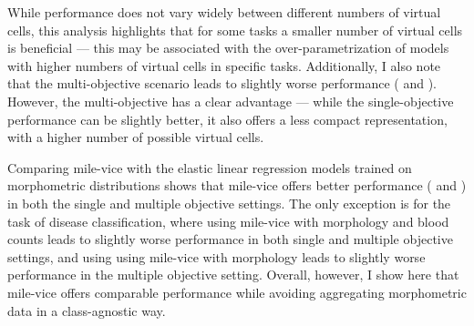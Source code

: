 While performance does not vary widely between different numbers of virtual cells, this analysis highlights that for some tasks a smaller number of virtual cells is beneficial --- this may be associated with the over-parametrization of models with higher numbers of virtual cells in specific tasks. Additionally, I also note that the multi-objective scenario leads to slightly worse performance ( and ). However, the multi-objective has a clear advantage --- while the single-objective performance can be slightly better, it also offers a less compact representation, with a higher number of possible virtual cells.

\begin{figure}[!ht]
    \label{fig:mile-vice-roc-curves}
\end{figure}

Comparing \ac{mile-vice} with the elastic linear regression models trained on morphometric distributions shows that \ac{mile-vice} offers better performance ( and ) in both the single and multiple objective settings. The only exception is for the task of disease classification, where using \ac{mile-vice} with morphology and blood counts leads to slightly worse performance in both single and multiple objective settings, and using using \ac{mile-vice} with morphology leads to slightly worse performance in the multiple objective setting. Overall, however, I show here that \ac{mile-vice} offers comparable performance while avoiding aggregating morphometric data in a class-agnostic way. 

\begin{figure}[!ht]
    \label{fig:mile-vice-vs-glmnet}
\end{figure}


